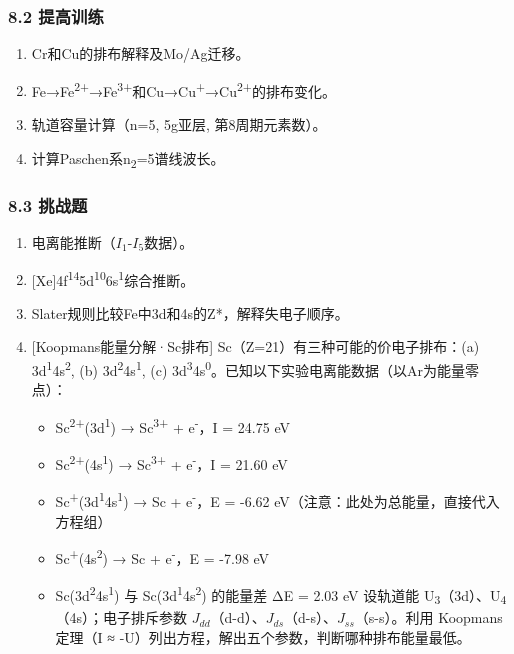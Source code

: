 \documentclass[a4paper,11pt]{ctexart}
\providecommand{\tightlist}{\setlength{\itemsep}{0pt}\setlength{\parskip}{0pt}}
\begin{document}
\subsubsection{8.2 提高训练}\label{ux63d0ux9ad8ux8badux7ec3}

\begin{enumerate}
\def\labelenumi{\arabic{enumi}.}
\setcounter{enumi}{4}
\tightlist
\item
  Cr和Cu的排布解释及Mo/Ag迁移。
\item
  Fe→Fe\textsuperscript{2+}→Fe\textsuperscript{3+}和Cu→Cu\textsuperscript{+}→Cu\textsuperscript{2+}的排布变化。
\item
  轨道容量计算（n=5, 5g亚层, 第8周期元素数）。
\item
  计算Paschen系n\textsubscript{2}=5谱线波长。
\end{enumerate}

\subsubsection{8.3 挑战题}\label{ux6311ux6218ux9898}

\begin{enumerate}
\def\labelenumi{\arabic{enumi}.}
\setcounter{enumi}{8}
\tightlist
\item
  电离能推断（\(I_1\)-\(I_5\)数据）。
\item
  {[}Xe{]}4f\textsuperscript{14}5d\textsuperscript{10}6s\textsuperscript{1}综合推断。
\item
  Slater规则比较Fe中3d和4s的Z*，解释失电子顺序。
\item
  {[}Koopmans能量分解·Sc排布{]} Sc（Z=21）有三种可能的价电子排布：(a) 3d\textsuperscript{1}4s\textsuperscript{2}, (b) 3d\textsuperscript{2}4s\textsuperscript{1}, (c) 3d\textsuperscript{3}4s\textsuperscript{0}。已知以下实验电离能数据（以Ar为能量零点）：

  \begin{itemize}
  \tightlist
  \item
    Sc\textsuperscript{2+}(3d\textsuperscript{1}) → Sc\textsuperscript{3+} + e\textsuperscript{-}，I = 24.75 eV
  \item
    Sc\textsuperscript{2+}(4s\textsuperscript{1}) → Sc\textsuperscript{3+} + e\textsuperscript{-}，I = 21.60 eV
  \item
    Sc\textsuperscript{+}(3d\textsuperscript{1}4s\textsuperscript{1}) → Sc + e\textsuperscript{-}，E = -6.62 eV（注意：此处为总能量，直接代入方程组）
  \item
    Sc\textsuperscript{+}(4s\textsuperscript{2}) → Sc + e\textsuperscript{-}，E = -7.98 eV
  \item
    Sc(3d\textsuperscript{2}4s\textsuperscript{1}) 与 Sc(3d\textsuperscript{1}4s\textsuperscript{2}) 的能量差 ΔE = 2.03 eV
    设轨道能 U\textsubscript{3}（3d）、U\textsubscript{4}（4s）；电子排斥参数 \(J_{dd}\)（d-d）、\(J_{ds}\)（d-s）、\(J_{ss}\)（s-s）。利用 Koopmans 定理（I ≈ -U）列出方程，解出五个参数，判断哪种排布能量最低。
  \end{itemize}
\end{enumerate}
\end{document}
